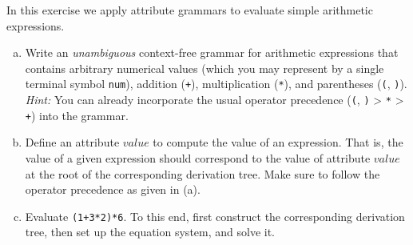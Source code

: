 \begin{exercise}{30}

In this exercise we apply attribute grammars to evaluate simple arithmetic expressions.
\begin{enumerate}[(a)]
  \item Write an \emph{unambiguous} context-free grammar for arithmetic expressions that contains arbitrary numerical values (which you may represent by a single terminal symbol \texttt{num}), addition (\texttt{+}), multiplication (\texttt{*}), and parentheses (\texttt{(}, \texttt{)}).\\
    \emph{Hint:} You can already incorporate the usual operator precedence (\texttt{(}, \texttt{)} > \texttt{*} > \texttt{+}) into the grammar.
  \item Define an attribute $\textit{value}$ to compute the value of an expression.
    That is, the value of a given expression should correspond to the value of attribute $\textit{value}$ at the root of the corresponding derivation tree.
    Make sure to follow the operator precedence as given in (a).
  \item Evaluate \texttt{(1+3*2)*6}.
    To this end, first construct the corresponding derivation tree, then set up the equation system, and solve it.
\end{enumerate}
\end{exercise}

